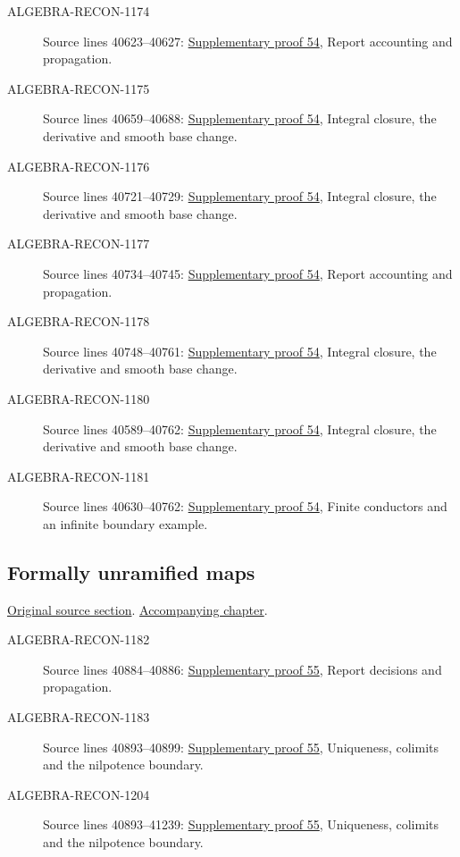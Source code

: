 \begin{description}
\item[ALGEBRA-RECON-1174] Source lines 40623--40627: \hyperlink{algebra_local_integral_notes_20260928}{Supplementary proof 54}, Report accounting and propagation.
\item[ALGEBRA-RECON-1175] Source lines 40659--40688: \hyperlink{algebra_local_integral_notes_20260928}{Supplementary proof 54}, Integral closure, the derivative and smooth base change.
\item[ALGEBRA-RECON-1176] Source lines 40721--40729: \hyperlink{algebra_local_integral_notes_20260928}{Supplementary proof 54}, Integral closure, the derivative and smooth base change.
\item[ALGEBRA-RECON-1177] Source lines 40734--40745: \hyperlink{algebra_local_integral_notes_20260928}{Supplementary proof 54}, Report accounting and propagation.
\item[ALGEBRA-RECON-1178] Source lines 40748--40761: \hyperlink{algebra_local_integral_notes_20260928}{Supplementary proof 54}, Integral closure, the derivative and smooth base change.
\item[ALGEBRA-RECON-1180] Source lines 40589--40762: \hyperlink{algebra_local_integral_notes_20260928}{Supplementary proof 54}, Integral closure, the derivative and smooth base change.
\item[ALGEBRA-RECON-1181] Source lines 40630--40762: \hyperlink{algebra_local_integral_notes_20260928}{Supplementary proof 54}, Finite conductors and an infinite boundary example.
\end{description}

\subsection{Formally unramified maps}
\hypertarget{algebra-source-section-formally-unramified}{}
\noindent\href{https://github.com/stacks/stacks-project/blob/a04446e57ec1fbc252a871afcec7752fb2807b14/algebra.tex\#L40769}{Original source section}. \href{algebra.pdf\#nameddest=section-formally-unramified}{Accompanying chapter}.

\begin{description}
\item[ALGEBRA-RECON-1182] Source lines 40884--40886: \hyperlink{algebra_conormal_thickening_notes_20260928}{Supplementary proof 55}, Report decisions and propagation.
\item[ALGEBRA-RECON-1183] Source lines 40893--40899: \hyperlink{algebra_conormal_thickening_notes_20260928}{Supplementary proof 55}, Uniqueness, colimits and the nilpotence boundary.
\item[ALGEBRA-RECON-1204] Source lines 40893--41239: \hyperlink{algebra_conormal_thickening_notes_20260928}{Supplementary proof 55}, Uniqueness, colimits and the nilpotence boundary.
\end{description}

